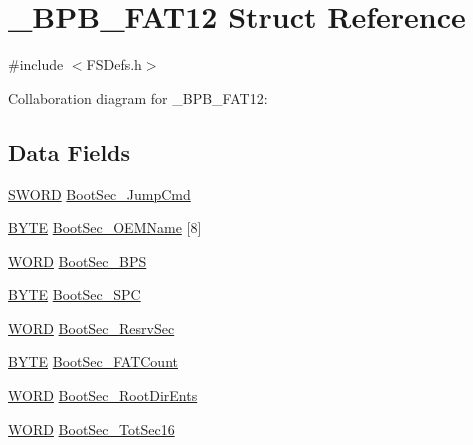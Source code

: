 \hypertarget{struct___b_p_b___f_a_t12}{}\section{\+\_\+\+B\+P\+B\+\_\+\+F\+A\+T12 Struct Reference}
\label{struct___b_p_b___f_a_t12}


{\ttfamily \#include $<$F\+S\+Defs.\+h$>$}



Collaboration diagram for \+\_\+\+B\+P\+B\+\_\+\+F\+A\+T12\+:
\subsection*{Data Fields}
\begin{DoxyCompactItemize}
\item 
\hyperlink{struct_s_w_o_r_d}{S\+W\+O\+R\+D} \hyperlink{struct___b_p_b___f_a_t12_ae5b5b0ce7c2b36b05f4feca437b0742a}{Boot\+Sec\+\_\+\+Jump\+Cmd}
\item 
\hyperlink{_generic_type_defs_8h_a4ae1dab0fb4b072a66584546209e7d58}{B\+Y\+T\+E} \hyperlink{struct___b_p_b___f_a_t12_ae5fce06ddd8aa2868537d62d324fd278}{Boot\+Sec\+\_\+\+O\+E\+M\+Name} \mbox{[}8\mbox{]}
\item 
\hyperlink{_generic_type_defs_8h_a2b0e863dadf920709ec53d9088ee7c91}{W\+O\+R\+D} \hyperlink{struct___b_p_b___f_a_t12_ad659c9ffa17932287cef58634e94b709}{Boot\+Sec\+\_\+\+B\+P\+S}
\item 
\hyperlink{_generic_type_defs_8h_a4ae1dab0fb4b072a66584546209e7d58}{B\+Y\+T\+E} \hyperlink{struct___b_p_b___f_a_t12_a8550ff725f1456f3790b39dce2e43b07}{Boot\+Sec\+\_\+\+S\+P\+C}
\item 
\hyperlink{_generic_type_defs_8h_a2b0e863dadf920709ec53d9088ee7c91}{W\+O\+R\+D} \hyperlink{struct___b_p_b___f_a_t12_a4da7001d1e395d0183666a5bd0f45a8c}{Boot\+Sec\+\_\+\+Resrv\+Sec}
\item 
\hyperlink{_generic_type_defs_8h_a4ae1dab0fb4b072a66584546209e7d58}{B\+Y\+T\+E} \hyperlink{struct___b_p_b___f_a_t12_a4650a56f7161008b1f07ba125a61d526}{Boot\+Sec\+\_\+\+F\+A\+T\+Count}
\item 
\hyperlink{_generic_type_defs_8h_a2b0e863dadf920709ec53d9088ee7c91}{W\+O\+R\+D} \hyperlink{struct___b_p_b___f_a_t12_a1c68f488ba8ec4c51228d23a8cba7213}{Boot\+Sec\+\_\+\+Root\+Dir\+Ents}
\item 
\hyperlink{_generic_type_defs_8h_a2b0e863dadf920709ec53d9088ee7c91}{W\+O\+R\+D} \hyperlink{struct___b_p_b___f_a_t12_ab2d1ff530ec98d72b60e2e78ea079e3a}{Boot\+Sec\+\_\+\+Tot\+Sec16}

\end{DoxyCompactItemize}
